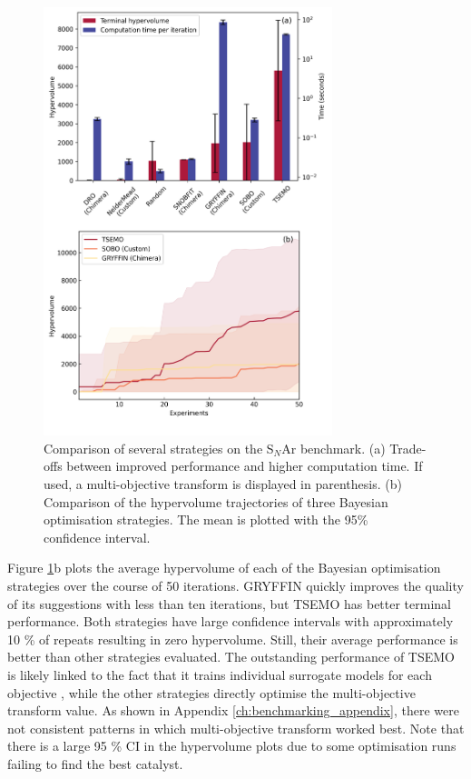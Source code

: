 \begin{figure}
    \centering
    \includegraphics[width=0.75\textwidth]{gfx/Chapter03/snar_hv_time_tradeoff.png}
    \caption{Comparison of several strategies on the S$_N$Ar benchmark. (a) Trade-offs between improved performance and higher computation time. If used, a multi-objective transform is displayed in parenthesis. (b) Comparison of the hypervolume trajectories of three Bayesian optimisation strategies. The mean is plotted with the 95\% confidence interval.}
    \label{fig:hv_time_tradeoff}
\end{figure}

Figure \ref{fig:hv_time_tradeoff}b plots the average hypervolume of each of the Bayesian optimisation strategies over the course of 50 iterations. GRYFFIN quickly improves the quality of its suggestions with less than ten iterations, but TSEMO has better terminal performance. Both strategies have large confidence intervals with approximately 10 \% of repeats resulting in zero hypervolume. Still, their average performance is better than other strategies evaluated. The outstanding performance of TSEMO is likely linked to the fact that it trains individual surrogate models for each objective \cite{Bradford2018}, while the other strategies directly optimise the multi-objective transform value. As shown in Appendix \ref{ch:benchmarking_appendix}, there were not consistent patterns in which multi-objective transform worked best. Note that there is a large 95 \% CI in the hypervolume plots due to some optimisation runs failing to find the best catalyst.

